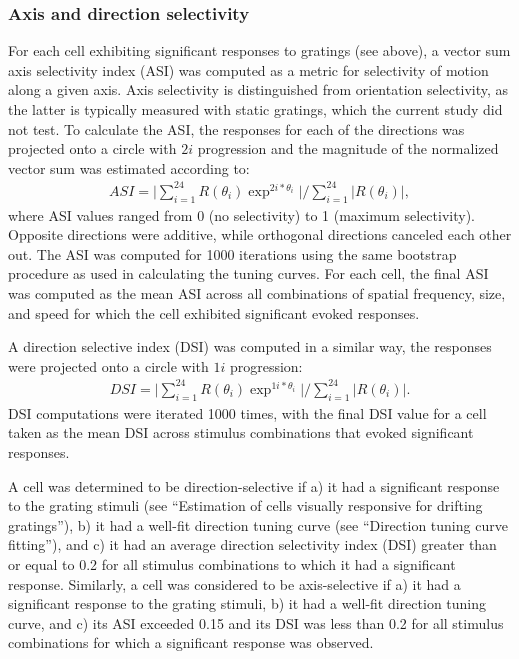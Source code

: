 \subsubsection{Axis and direction selectivity}
For each cell exhibiting significant responses to gratings (see above), a vector sum axis selectivity index (ASI) was computed as a metric for selectivity of motion along a given axis\cite{Liang2018, Kerlin2010}. Axis selectivity is distinguished from orientation selectivity, as the latter is typically measured with static gratings, which the current study did not test. To calculate the ASI, the responses for each of the directions was projected onto a circle with $2i$ progression and the magnitude of the normalized vector sum was estimated according to: 
\begin{align}
    ASI=\big|\sum_{i=1}^{24} R(\theta_i) \exp^{2i*\theta_i}\big|/\sum_{i=1}^{24}|R(\theta_i)|, 
\end{align}
where ASI values ranged from 0 (no selectivity) to 1 (maximum selectivity). Opposite directions were additive, while orthogonal directions canceled each other out. The ASI was computed for 1000 iterations using the same bootstrap procedure as used in calculating the tuning curves. For each cell, the final ASI was computed as the mean ASI across all combinations of spatial frequency, size, and speed for which the cell exhibited significant evoked responses. 

A direction selective index (DSI) was computed in a similar way, the responses were projected onto a circle with $1i$ progression:  \begin{align}
    DSI=\big|\sum_{i=1}^{24} R(\theta_i) \exp^{1i*\theta_i}\big|/\sum_{i=1}^{24}|R(\theta_i)|.
\end{align}
DSI computations were iterated 1000 times, with the final DSI value for a cell taken as the mean DSI across stimulus combinations that evoked significant responses. 

A cell was determined to be direction-selective if a) it had a significant response to the grating stimuli (see ``Estimation of cells visually responsive for drifting gratings''), b) it had a well-fit direction tuning curve (see ``Direction tuning curve fitting''), and c) it had an average direction selectivity index (DSI) greater than or equal to 0.2\cite{Liang2018} for all stimulus combinations to which it had a significant response. Similarly, a cell was considered to be axis-selective if a) it had a significant response to the grating stimuli, b) it had a well-fit direction tuning curve, and c) its ASI exceeded 0.15 and its DSI was less than 0.2 for all stimulus combinations for which a significant response was observed.

